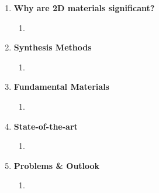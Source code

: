 \documentclass{article}
\begin{document}
\begin{enumerate}
\begin{enumerate}
		\end{enumerate} %
	\item{\textbf{Why are 2D materials significant?}}
		\begin{enumerate} %
			\item{}
		\end{enumerate} %
	\item{\textbf{Synthesis Methods}}
		\begin{enumerate} %
			\item{}
		\end{enumerate} %
	\item{\textbf{Fundamental Materials}} 
		\begin{enumerate}	%
			\item{}
		\end{enumerate} %
	\item{\textbf{State-of-the-art}}
		\begin{enumerate} %
			\item{}
		\end{enumerate}	%
	\item{\textbf{Problems \& Outlook}}
		\begin{enumerate}	%
			\item{}
		\end{enumerate} %
\end{enumerate} %



\end{document}
